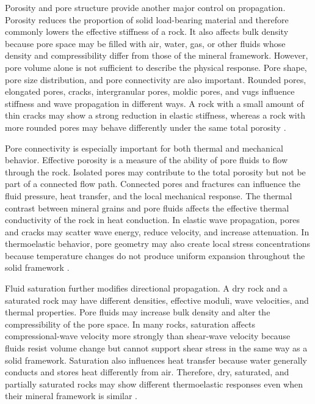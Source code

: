 Porosity and pore structure provide another major control on propagation. Porosity reduces the proportion of solid load-bearing material and therefore commonly lowers the effective stiffness of a rock. It also affects bulk density because pore space may be filled with air, water, gas, or other fluids whose density and compressibility differ from those of the mineral framework. However, pore volume alone is not sufficient to describe the physical response. Pore shape, pore size distribution, and pore connectivity are also important. Rounded pores, elongated pores, cracks, intergranular pores, moldic pores, and vugs influence stiffness and wave propagation in different ways. A rock with a small amount of thin cracks may show a strong reduction in elastic stiffness, whereas a rock with more rounded pores may behave differently under the same total porosity \cite{mavko2009,wolff1982}.

Pore connectivity is especially important for both thermal and mechanical behavior. Effective porosity is a measure of the ability of pore fluids to flow through the rock. Isolated pores may contribute to the total porosity but not be part of a connected flow path. Connected pores and fractures can influence the fluid pressure, heat transfer, and the local mechanical response. The thermal contrast between mineral grains and pore fluids affects the effective thermal conductivity of the rock in heat conduction. In elastic wave propagation, pores and cracks may scatter wave energy, reduce velocity, and increase attenuation. In thermoelastic behavior, pore geometry may also create local stress concentrations because temperature changes do not produce uniform expansion throughout the solid framework \cite{robertson1988,wolff1982,mavko2009}.

Fluid saturation further modifies directional propagation. A dry rock and a saturated rock may have different densities, effective moduli, wave velocities, and thermal properties. Pore fluids may increase bulk density and alter the compressibility of the pore space. In many rocks, saturation affects compressional-wave velocity more strongly than shear-wave velocity because fluids resist volume change but cannot support shear stress in the same way as a solid framework. Saturation also influences heat transfer because water generally conducts and stores heat differently from air. Therefore, dry, saturated, and partially saturated rocks may show different thermoelastic responses even when their mineral framework is similar \cite{mavko2009,aki2002,robertson1988}.

